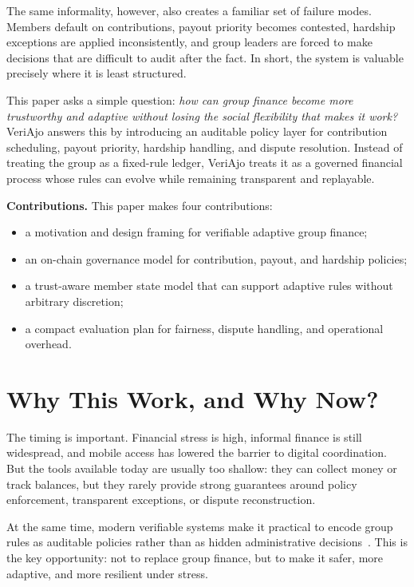 \documentclass[10pt, conference]{IEEEtran}
\begin{document}
The same informality, however, also creates a familiar set of failure modes. Members default on contributions, payout priority becomes contested, hardship exceptions are applied inconsistently, and group leaders are forced to make decisions that are difficult to audit after the fact. In short, the system is valuable precisely where it is least structured.

This paper asks a simple question: \emph{how can group finance become more trustworthy and adaptive without losing the social flexibility that makes it work?} VeriAjo answers this by introducing an auditable policy layer for contribution scheduling, payout priority, hardship handling, and dispute resolution. Instead of treating the group as a fixed-rule ledger, VeriAjo treats it as a governed financial process whose rules can evolve while remaining transparent and replayable.

\textbf{Contributions.} This paper makes four contributions:
\begin{itemize}
    \item a motivation and design framing for verifiable adaptive group finance;
    \item an on-chain governance model for contribution, payout, and hardship policies;
    \item a trust-aware member state model that can support adaptive rules without arbitrary discretion;
    \item a compact evaluation plan for fairness, dispute handling, and operational overhead.
\end{itemize}

\section{Why This Work, and Why Now?}
The timing is important. Financial stress is high, informal finance is still widespread, and mobile access has lowered the barrier to digital coordination. But the tools available today are usually too shallow: they can collect money or track balances, but they rarely provide strong guarantees around policy enforcement, transparent exceptions, or dispute reconstruction.

At the same time, modern verifiable systems make it practical to encode group rules as auditable policies rather than as hidden administrative decisions~\cite{shi2016edge}. This is the key opportunity: not to replace group finance, but to make it safer, more adaptive, and more resilient under stress.
\end{document}
